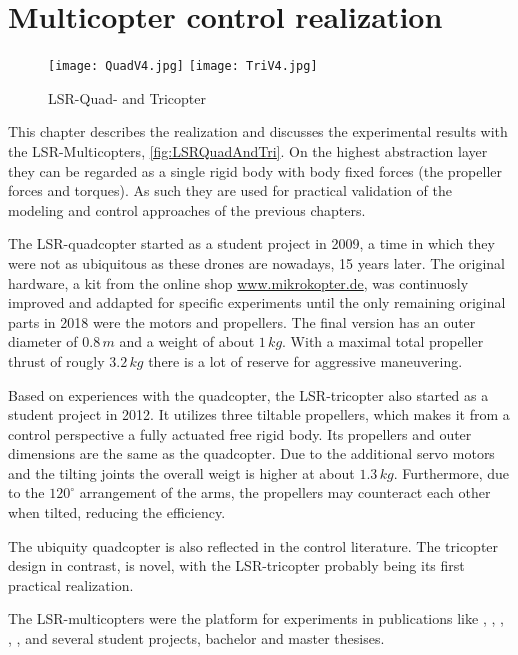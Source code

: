 \chapter{Multicopter control realization}\label{sec:MulticopterRealization}

\begin{figure}
 \centering
 \texttt{[image: QuadV4.jpg]}
 \hspace{.05\linewidth}
 \texttt{[image: TriV4.jpg]}
 \caption{LSR-Quad- and Tricopter}
 \label{fig:LSRQuadAndTri}
\end{figure}

This chapter describes the realization and discusses the experimental results with the LSR-Multicopters, \autoref{fig:LSRQuadAndTri}.
On the highest abstraction layer they can be regarded as a single rigid body with body fixed forces (the propeller forces and torques).
As such they are used for practical validation of the modeling and control approaches of the previous chapters.

The LSR-quadcopter started as a student project in 2009, a time in which they were not as ubiquitous as these drones are nowadays, 15 years later.
The original hardware, a kit from the online shop \url{www.mikrokopter.de}, was continuosly improved and addapted for specific experiments until the only remaining original parts in 2018 were the motors and propellers.
The final version has an outer diameter of $0.8\,\unit{m}$ and a weight of about $1\,\unit{kg}$.
With a maximal total propeller thrust of rougly $3.2\,\unit{kg}$ there is a lot of reserve for aggressive maneuvering. 

Based on experiences with the quadcopter, the LSR-tricopter also started as a student project in 2012.
It utilizes three tiltable propellers, which makes it from a control perspective a fully actuated free rigid body.
Its propellers and outer dimensions are the same as the quadcopter.
Due to the additional servo motors and the tilting joints the overall weigt is higher at about $1.3\,\unit{kg}$.
Furthermore, due to the $120^\circ$ arrangement of the arms, the propellers may counteract each other when tilted, reducing the efficiency.

The ubiquity quadcopter is also reflected in the control literature.
The tricopter design in contrast, is novel, with the LSR-tricopter probably being its first practical realization.  

The LSR-multicopters were the platform for experiments in publications like \cite{Kastelan:Tricopter}, \cite{Servais:Tricopter}, \cite{Servais:TricopterPendulumLoad}, \cite{Konz:Mechatronics}, \cite{Irscheid:HeavyRopesTricopter}, \cite{Konz:GaussTrackingControl} and several student projects, bachelor and master thesises.
